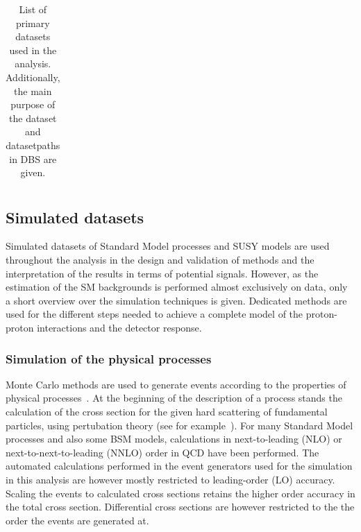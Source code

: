 \begin{table}
\begin{center}
\begin{tabular}{c|c|c}
\end{tabular}


\caption{List of primary datasets used in the analysis. Additionally, the main purpose of the dataset and datasetpaths in DBS are given.}
\label{tab:datasets}
\end{center}
\end{table}



\subsection{Simulated datasets}
Simulated datasets of Standard Model processes and SUSY models are used throughout the analysis in the design and validation of methods and the interpretation of the results in terms of potential signals. However, as the estimation of the SM backgrounds is performed almost exclusively on data, only a short overview over the simulation techniques is given. Dedicated methods are used for the different steps needed to achieve a complete model of the proton-proton interactions and the detector response. 
\subsubsection{Simulation of the physical processes}
\label{sec:MCGen}
Monte Carlo methods are used to generate events according to the properties of physical processes~\cite{PDG}.
At the beginning of the description of a process stands the calculation of the cross section for the given hard scattering of fundamental particles, using pertubation theory (see for example~\cite{HalzenMartin}). For many Standard Model processes and also some BSM models, calculations in next-to-leading (NLO) or next-to-next-to-leading (NNLO) order in QCD have been performed. The automated calculations performed in the event generators used for the simulation in this analysis are however mostly restricted to leading-order (LO) accuracy. Scaling the events to calculated cross sections retains the higher order accuracy in the total cross section. Differential cross sections are however restricted to the the order the events are generated at.  

